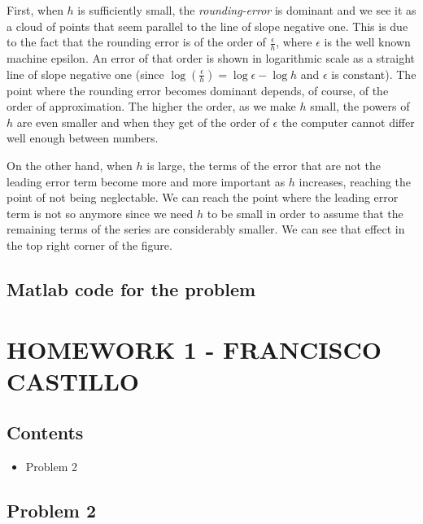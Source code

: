 \begin{solution}
First, when $h$ is sufficiently small, the \textit{rounding-error} is dominant and we see it as a cloud of points that seem parallel to the line of slope negative one. This is due to the fact that the rounding error is of the order of $\frac{\epsilon}{h}$, where $\epsilon$ is the well known machine epsilon. An error of that order is shown in logarithmic scale as a straight line of slope negative one (since $\log{(\frac{\epsilon}{h})}=\log{\epsilon}-\log{h}$ and $\epsilon$ is constant). The point where the rounding error becomes dominant depends, of course, of the order of approximation. The higher the order, as we make $h$ small, the powers of $h$ are even smaller and when they get of the order of $\epsilon$ the computer cannot differ well enough between numbers. 

On the other hand, when $h$ is large, the terms of the error that are not the leading error term become more and more important as $h$ increases, reaching the point of not being neglectable. We can reach the point where the leading error term is not so anymore since we need $h$ to be small in order to assume that the remaining terms of the series are considerably smaller. We can see that effect in the top right corner of the figure.

\subsection*{Matlab code for the problem}
\section*{HOMEWORK 1 - FRANCISCO CASTILLO}


\subsection*{Contents}

\begin{itemize}
\setlength{\itemsep}{-1ex}
   \item Problem 2
\end{itemize}


\subsection*{Problem 2}


\end{solution}
